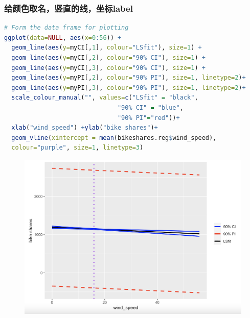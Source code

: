 \documentclass[11pt,a4paper]{article}
\begin{document}
\subsubsection{给颜色取名，竖直的线，坐标label}
\begin{lstlisting}[language=R]
# Form the data frame for plotting
ggplot(data=NULL, aes(x=0:56)) + 
  geom_line(aes(y=myCI[,1], colour="LSfit"), size=1) + 
  geom_line(aes(y=myCI[,2], colour="90% CI"), size=1) +
  geom_line(aes(y=myCI[,3], colour="90% CI"), size=1) +
  geom_line(aes(y=myPI[,2], colour="90% PI"), size=1, linetype=2)+
  geom_line(aes(y=myPI[,3], colour="90% PI"), size=1, linetype=2)+ 
  scale_colour_manual("", values=c("LSfit" = "black",
                               "90% CI" = "blue", 
                               "90% PI"="red"))+ 
  xlab("wind_speed") +ylab("bike shares")+ 
  geom_vline(xintercept = mean(bikeshares.reg$wind_speed),
  colour="purple", size=1, linetype=3)
\end{lstlisting}
\begin{center}\begin{figure}[htbp]
    \centering
    \includegraphics[scale=0.5]{week501.png}
    \caption{}
    \label{}
\end{figure}\end{center}
\end{document}
